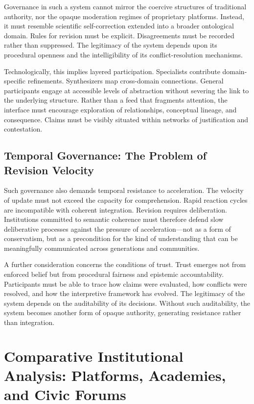 \documentclass[12pt]{article}
\begin{document}
Governance in such a system cannot mirror the coercive structures of traditional authority, nor the opaque moderation regimes of proprietary platforms. Instead, it must resemble scientific self-correction extended into a broader ontological domain. Rules for revision must be explicit. Disagreements must be recorded rather than suppressed. The legitimacy of the system depends upon its procedural openness and the intelligibility of its conflict-resolution mechanisms.

Technologically, this implies layered participation. Specialists contribute domain-specific refinements. Synthesizers map cross-domain connections. General participants engage at accessible levels of abstraction without severing the link to the underlying structure. Rather than a feed that fragments attention, the interface must encourage exploration of relationships, conceptual lineage, and consequence. Claims must be visibly situated within networks of justification and contestation.

\subsection{Temporal Governance: The Problem of Revision Velocity}

Such governance also demands temporal resistance to acceleration. The velocity of update must not exceed the capacity for comprehension. Rapid reaction cycles are incompatible with coherent integration. Revision requires deliberation. Institutions committed to semantic coherence must therefore defend slow deliberative processes against the pressure of acceleration---not as a form of conservatism, but as a precondition for the kind of understanding that can be meaningfully communicated across generations and communities.

A further consideration concerns the conditions of trust. Trust emerges not from enforced belief but from procedural fairness and epistemic accountability. Participants must be able to trace how claims were evaluated, how conflicts were resolved, and how the interpretive framework has evolved. The legitimacy of the system depends on the auditability of its decisions. Without such auditability, the system becomes another form of opaque authority, generating resistance rather than integration.

\section{Comparative Institutional Analysis: Platforms, Academies, and Civic Forums}
\label{sec:comparative}
\end{document}
